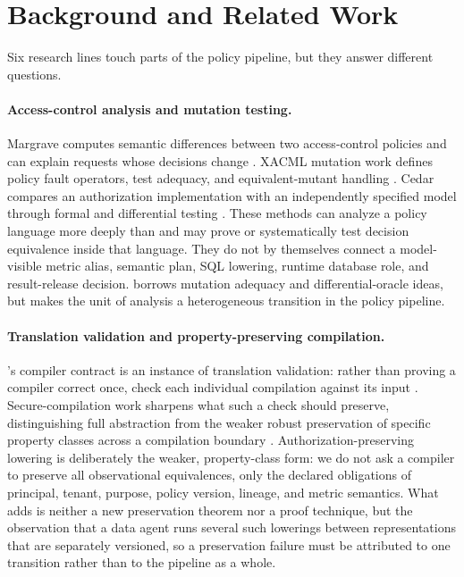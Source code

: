 \section{Background and Related Work}

Six research lines touch parts of the policy pipeline, but they answer different questions.

\paragraph{Access-control analysis and mutation testing.}
Margrave computes semantic differences between two access-control policies and can explain requests whose decisions change \citep{margrave}. XACML mutation work defines policy fault operators, test adequacy, and equivalent-mutant handling \citep{xacml_mutation}. Cedar compares an authorization implementation with an independently specified model through formal and differential testing \citep{cedar_vgd}. These methods can analyze a policy language more deeply than \policystrata{} and may prove or systematically test decision equivalence inside that language. They do not by themselves connect a model-visible metric alias, semantic plan, SQL lowering, runtime database role, and result-release decision. \policystrata{} borrows mutation adequacy and differential-oracle ideas, but makes the unit of analysis a heterogeneous transition in the policy pipeline.

\paragraph{Translation validation and property-preserving compilation.}
\policystrata{}'s compiler contract is an instance of translation validation: rather than proving a compiler correct once, check each individual compilation against its input \citep{translation_validation}. Secure-compilation work sharpens what such a check should preserve, distinguishing full abstraction from the weaker robust preservation of specific property classes across a compilation boundary \citep{secure_compilation}. Authorization-preserving lowering is deliberately the weaker, property-class form: we do not ask a compiler to preserve all observational equivalences, only the declared obligations of principal, tenant, purpose, policy version, lineage, and metric semantics. What \policystrata{} adds is neither a new preservation theorem nor a proof technique, but the observation that a data agent runs several such lowerings between representations that are separately versioned, so a preservation failure must be attributed to one transition rather than to the pipeline as a whole.

